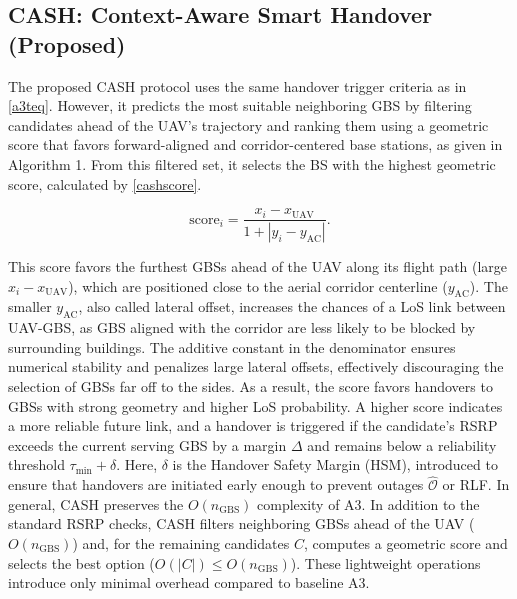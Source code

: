 \documentclass[10pt,conference]{IEEEtran}
\newcommand*\zc[1]{\textcolor{blue}{Zach: #1}}
\begin{document}
\subsection{CASH: Context-Aware Smart Handover (Proposed)}
The proposed CASH protocol uses the same handover trigger criteria as in \eqref{a3teq}. However, it predicts the most suitable neighboring GBS by filtering candidates ahead of the UAV’s trajectory and ranking them using a geometric score that favors forward-aligned and corridor-centered base stations, as given in Algorithm 1. From this filtered set, it selects the BS with the highest geometric score, calculated by \eqref{cashscore}.

\begin{equation}
\label{cashscore}
\text{score}_i = \frac{x_i - x_{\text{UAV}}}{1 + |y_i - y_{\text{AC}}|}.
\end{equation}

This score favors the furthest GBSs ahead of the UAV along its flight path (large $x_i - x_{\text{UAV}}$), which are positioned close to the aerial corridor centerline ($ y_{\text{AC}}$). The smaller $y_{\text{AC}}$, also called lateral offset, increases the chances of a LoS link between UAV-GBS, as GBS aligned with the corridor are less likely to be blocked by surrounding buildings. The additive constant in the denominator ensures numerical stability and penalizes large lateral offsets, effectively discouraging the selection of GBSs far off to the sides. As a result, the score favors handovers to GBSs with strong geometry and higher LoS probability. A higher score indicates a more reliable future link, and a handover is triggered if the candidate’s RSRP exceeds the current serving GBS by a margin $\Delta$ and remains below a reliability threshold $\tau_{\min} + \delta$. Here, $\delta$ is the Handover Safety Margin (HSM), introduced to ensure that handovers are initiated early enough to prevent outages $\hat{\mathcal{O}}$ or RLF. In general, CASH preserves the $O(n_{\text{GBS}})$ complexity of A3. In addition to the standard RSRP checks, CASH filters neighboring GBSs ahead of the UAV ($O(n_{\text{GBS}})$) and, for the remaining candidates $C$, computes a geometric score and selects the best option ($O(|C|) \leq O(n_{\text{GBS}})$). These lightweight operations introduce only minimal overhead compared to baseline A3.





\end{document}
